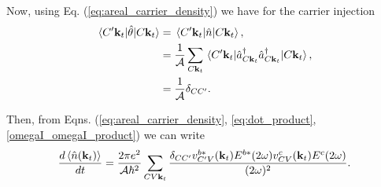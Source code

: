 \documentclass{article}
\newcommand{\kt}{\mathbf{k}_{t}}
\newcommand{\Op}{\hat{\mathcal{\theta}}}
\newcommand{\n}{\hat{n}(\kt)}
\begin{document}
Now, using Eq. (\ref{eq:areal_carrier_density}) we have for the carrier
injection 
\begin{align}
\mel*{C'\kt}{\Op}{C\kt} 
&= \mel*{C'\kt}{\hat{n}}{C\kt} , \nonumber \\
&= \frac{1}{\mathcal{A}} \sum_{C\kt} 
\mel*{C'\kt}{\hat{a}^{\dag}_{C\kt} \hat{a}^{\dag}_{C\kt}}{C\kt} , \nonumber \\
&= \frac{1}{\mathcal{A}} \delta_{CC'} .
\end{align}

Then, from Eqns. (\ref{eq:areal_carrier_density}, \ref{eq:dot_product},
\ref{omegaI_omegaI_product}) we can write 
\begin{equation*}
\frac{d\ev*{\n}}{dt} = \frac{2\pi e^{2}}{\mathcal{A}\hbar^{2}} \sum_{CV\kt}
\frac{\delta_{CC'}v^{b*}_{C'V}(\kt)E^{b*}(2\omega)v^{c}_{CV}(\kt)E^{c}(2\omega)}{(2\omega)^{2}}.
\end{equation*}



\end{document}
